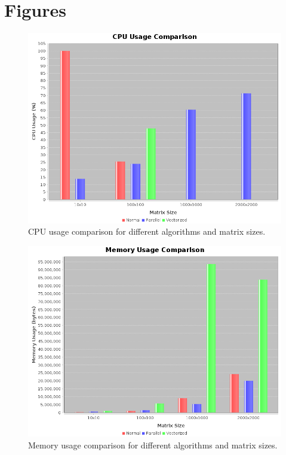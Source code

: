 \documentclass[a4paper,12pt]{article}
\begin{document}
\newpage
\section*{Figures}

\begin{figure}[H]
    \centering
    \includegraphics[width=\textwidth]{CompareCPU.png}
    \caption{CPU usage comparison for different algorithms and matrix sizes.}
    \label{fig:cpu}
\end{figure}

\begin{figure}[H]
    \centering
    \includegraphics[width=\textwidth]{CompareMemory.png}
    \caption{Memory usage comparison for different algorithms and matrix sizes.}
    \label{fig:memory}
\end{figure}
\end{document}
